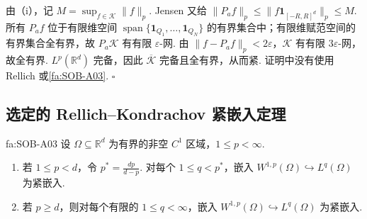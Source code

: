 \begin{FAProof}
由（i），记 \(\displaystyle M=\sup_{f\in\mathcal K}\|f\|_p\). Jensen 又给 \(\displaystyle\|P_af\|_p\leqslant\|f\mathbf1_{[-R,R]^d}\|_p\leqslant M\). 所有 \(\displaystyle P_af\) 位于有限维空间 \(\displaystyle\operatorname{span}\{\mathbf1_{Q_1},\dots,\mathbf1_{Q_N}\}\) 的有界集合中；有限维赋范空间的有界集合全有界，故 \(\displaystyle P_a\mathcal K\) 有有限 \(\displaystyle\varepsilon\)-网. 由 \(\displaystyle\|f-P_af\|_p<2\varepsilon\)，\(\displaystyle\mathcal K\) 有有限 \(\displaystyle3\varepsilon\)-网，故全有界. \(\displaystyle L^p(\mathbb R^d)\) 完备，因此 \(\displaystyle\overline{\mathcal K}\) 完备且全有界，从而紧. 证明中没有使用 Rellich 或\autoref{fa:SOB-A03}.
\hfill\(\square\)
\end{FAProof}

\newpage
\subsection{选定的 Rellich--Kondrachov 紧嵌入定理}

\begin{FATheorem}{fa:SOB-A03}
设 \(\displaystyle\Omega\subseteq\mathbb R^d\) 为有界的非空 \(\displaystyle C^1\) 区域，\(\displaystyle1\leqslant p<\infty\).
\begin{enumerate}[label=\textup{(\alph*)}]
\item 若 \(\displaystyle1\leqslant p<d\)，令 \(\displaystyle p^*=\frac{dp}{d-p}\). 对每个 \(\displaystyle1\leqslant q<p^*\)，嵌入 \(\displaystyle W^{1,p}(\Omega)\hookrightarrow L^q(\Omega)\) 为紧嵌入.
\item 若 \(\displaystyle p\geqslant d\)，则对每个有限的 \(\displaystyle1\leqslant q<\infty\)，嵌入 \(\displaystyle W^{1,p}(\Omega)\hookrightarrow L^q(\Omega)\) 为紧嵌入.
\end{enumerate}
\end{FATheorem}

